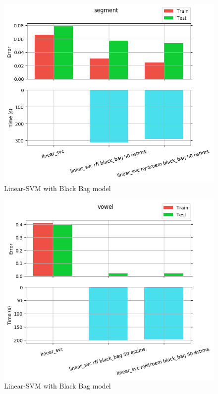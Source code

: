\begin{figure}[th]
\centering
\includegraphics[scale=\imgscale]{Figures/2_6/segment}
\decoRule
\caption[2.6 segment]{Linear-SVM with Black Bag model}
\label{fig:2_6_segment}
\end{figure}

\begin{figure}[th]
\centering
\includegraphics[scale=\imgscale]{Figures/2_6/vowel}
\decoRule
\caption[2.6 vowel]{Linear-SVM with Black Bag model}
\label{fig:vowel}
\end{figure}
